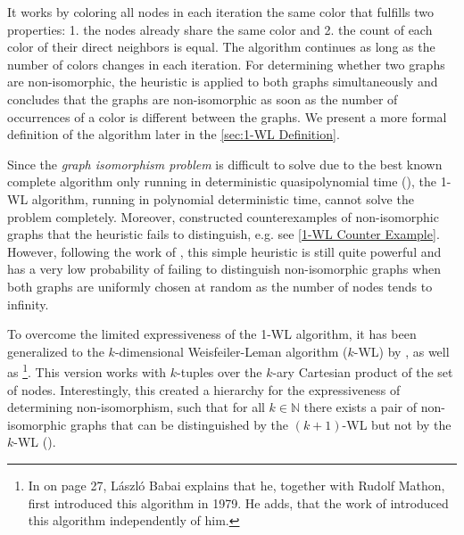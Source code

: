 \documentclass[11pt, dvipsnames, DIV=12]{scrreprt}
\theoremstyle{definition}
\begin{document}
It works by coloring all nodes in each iteration the same color that fulfills two properties: 1. the nodes already share the same color and 2. the count of each color of their direct neighbors is equal. The algorithm continues as long as the number of colors changes in each iteration.
For determining whether two graphs are non-isomorphic, the heuristic is applied to both graphs simultaneously and concludes that the graphs are non-isomorphic as soon as the number of occurrences of a color is different between the graphs. We present a more formal definition of the algorithm later in the \autoref{sec:1-WL Definition}.

Since the \textit{graph isomorphism problem} is difficult to solve due to the best known complete algorithm only running in deterministic quasipolynomial time (\cite{Babai2016}), the 1-WL algorithm, running in polynomial deterministic time, cannot solve the problem completely. Moreover, \cite{Cai1992} constructed counterexamples of non-isomorphic graphs that the heuristic fails to distinguish, e.g. see \autoref{1-WL Counter Example}. However, following the work of \cite{Bab+1979}, this simple heuristic is still quite powerful and has a very low probability of failing to distinguish non-isomorphic graphs when both graphs are uniformly chosen at random as the number of nodes tends to infinity.

To overcome the limited expressiveness of the 1-WL algorithm, it has been generalized to the $k$-dimensional Weisfeiler-Leman algorithm ($k$-WL) by \cite{Bab1979, Babai2016}, as well as \cite{Imm+1990}\footnote{In \cite{Babai2016} on page 27, László Babai explains that he, together with Rudolf Mathon, first introduced this algorithm in 1979. He adds, that the work of \cite{Imm+1990} introduced this algorithm independently of him.}. This version works with $k$-tuples over the $k$-ary Cartesian product of the set of nodes. Interestingly, this created a hierarchy for the expressiveness of determining non-isomorphism, such that for all $k \in \mathbb{N}$ there exists a pair of non-isomorphic graphs that can be distinguished by the $(k+1)$-WL but not by the $k$-WL (\cite{Cai1992}).
\end{document}
